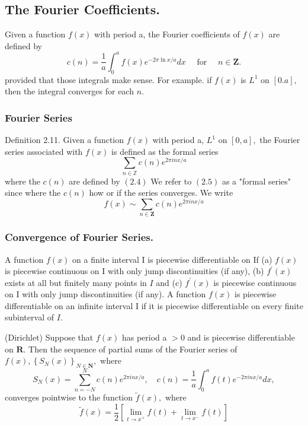 \subsection{The Fourier Coefficients.}
\begin{definition}
Given a function $f(x)$ with period a, the Fourier coefficients
of $f(x)$ are defined by
$$
c(n)=\frac{1}{a} \int_{0}^{a} f(x) e^{-2 \pi \ln x / a} d x \quad \text { for } \quad n \in \mathbf{Z} .
$$
provided that those integrals make sense. For example. if $f(x)$ is $L^{1}$ on $[0 . a],$ then
the integral converges for each $n$.
\end{definition}

\subsubsection{Fourier Series}
\begin{definition}
Definition 2.11. Given a function $f(x)$ with period a, $L^{1}$ on $[0, a],$ the Fourier
series associated with $f(x)$ is defined as the formal series
$$
\sum_{n \in \mathbb{Z}} c(n) e^{2 \pi i n x / a}
$$
where the $c(n)$ are defined by $(2.4)$ We refer to $(2.5)$ as a "formal series" since
where the $c(n)$ how or if the series converges. We write
$$
f(x) \sim \sum_{n \in \mathbf{Z}} c(n) e^{2 \pi i n x / a}
$$
\end{definition}

\subsubsection{Convergence of Fourier Series.}

\begin{definition}
A function $f(x)$ on a finite interval I is piecewise differentiable on If (a) $f(x)$ is piecewise continuous on I with only jump discontinuities (if any), (b) $f^{\prime}(x)$ exists at all but finitely many points in $I$ and (c) $f^{\prime}(x)$ is piecewise continuous on I with only jump discontinuities (if any). A function $f(x)$ is piecewise differentiable on an infinite interval I if it is piecewise differentiable on every finite subinterval of $I$.
\end{definition}

\begin{theorem}
(Dirichlet) Suppose that $f(x)$ has period a $>0$ and is piecewise differentiable on $\mathbf{R} .$ Then the sequence of partial sums of the Fourier series of $f(x),\left\{S_{N}(x)\right\}_{N \in \mathbf{N}},$ where
$$
S_{N}(x)=\sum_{n=-N}^{N} c(n) e^{2 \pi i n x / a}, \quad c(n)=\frac{1}{a} \int_{0}^{a} f(t) e^{-2 \pi i n x / a} d x,
$$
converges pointwise to the function $\tilde{f}(x),$ where
$$
\tilde{f}(x)=\frac{1}{2}\left[\lim _{t \rightarrow x^{+}} f(t)+\lim _{t \rightarrow x^{-}} f(t)\right]
$$
\end{theorem}

